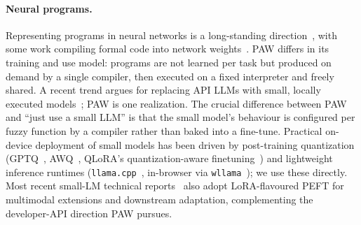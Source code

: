 \documentclass{article}
\theoremstyle{plain}
\theoremstyle{definition}
\theoremstyle{remark}
\begin{document}

\paragraph{Neural programs.}
Representing programs in neural networks is a long-standing direction~\citep{graves2014neuralturingmachines,reed2016neuralprogrammerinterpreters}, with some work compiling formal code into network weights~\citep{weiss2021thinkingliketransformers,GRUAU19951}. PAW differs in its training and use model: programs are not learned per task but produced on demand by a single compiler, then executed on a fixed interpreter and freely shared. A recent trend argues for replacing API LLMs with small, locally executed models~\citep{belcak2025smalllanguagemodelsfuture,phi42024,gemma3_2025}; PAW is one realization. The crucial difference between PAW and ``just use a small LLM'' is that the small model's behaviour is configured per fuzzy function by a compiler rather than baked into a fine-tune. Practical on-device deployment of small models has been driven by post-training quantization (GPTQ~\citep{frantar2023gptq}, AWQ~\citep{lin2024awq}, QLoRA's quantization-aware finetuning~\citep{dettmers2023qlora}) and lightweight inference runtimes (\texttt{llama.cpp}~\citep{llamacpp}, in-browser via \texttt{wllama}~\citep{wllama}); we use these directly. Most recent small-LM technical reports~\citep{phi42024,gemma3_2025} also adopt LoRA-flavoured PEFT for multimodal extensions and downstream adaptation, complementing the developer-API direction PAW pursues.
\end{document}
